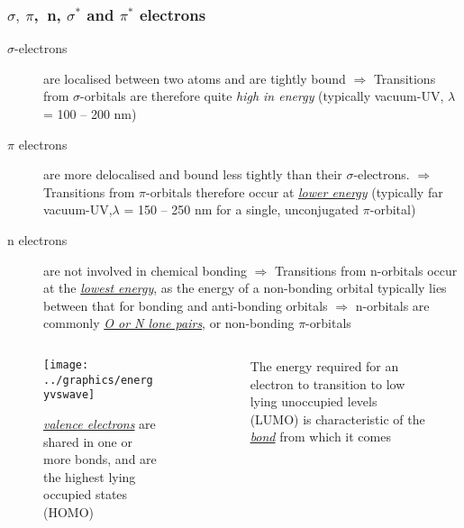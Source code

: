 \documentclass[a4paper,12pt,titlepage]{article}
\begin{document}
\begin{frame}
\frametitle{\(\sigma,\  \pi\),\ n, \(\sigma^*\) and \(\pi^*\) electrons}
\begin{description}
\item[\(\sigma\)-electrons] are localised between two atoms and are tightly bound\newline 
\(\Rightarrow\) Transitions from \(\sigma\)-orbitals are therefore quite \emph{high in energy} (typically vacuum-UV, \(\lambda\) = 100 -- 200 nm)
\item[\(\pi\) electrons] are more delocalised and bound less tightly than their \(\sigma\)-electrons.\newline
\(\Rightarrow\) Transitions from \(\pi\)-orbitals therefore occur at \emph{\underline{lower energy}} (typically far vacuum-UV,\(\lambda\) = 150 -- 250 nm for a single, unconjugated \(\pi\)-orbital)
\item[n electrons] are not involved in chemical bonding\newline
\(\Rightarrow\) Transitions from n-orbitals occur at the \emph{\underline{lowest energy}}, as the energy of a non-bonding orbital typically lies between that for bonding and anti-bonding orbitals
\(\Rightarrow\) n-orbitals are commonly \emph{\underline{O or N lone pairs}}, or non-bonding \(\pi\)-orbitals
\end{description}
\end{frame}

\begin{frame}
\begin{columns}[onlytextwidth]
\begin{column}{.5\textwidth}
\begin{figure}
\caption{\emph{\underline{valence electrons}} are shared in one or more bonds, and are the highest lying occupied states (HOMO)}
\texttt{[image: ../graphics/energyvswave]} 
\end{figure} 
\end{column}
\begin{column}{.5\textwidth}
\begin{figure}
\caption{The energy required for an electron to transition to low lying unoccupied levels (LUMO) is characteristic of the \emph{\underline{bond}} from which it comes} 
\end{figure}
\end{column}
\end{columns}
\end{frame}
\end{document}
